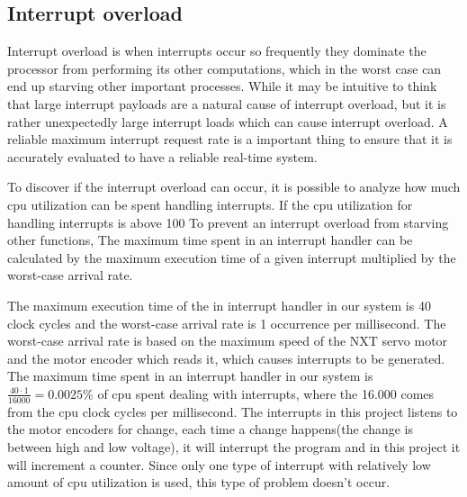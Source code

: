 \subsection{Interrupt overload}
\label{sec:Interrupt overload}


Interrupt overload is when interrupts occur so frequently they dominate the processor from performing its other computations, which in the worst case can end up starving other important processes\citep{safe}. While it may be intuitive to think that large interrupt payloads are a natural cause of interrupt overload, but it is rather unexpectedly large interrupt loads which can cause interrupt overload. A reliable maximum interrupt request rate is a important thing to ensure that it is accurately evaluated to have a reliable real-time system.


To discover if the interrupt overload can occur, it is possible to analyze how much cpu utilization can be spent handling interrupts. If the cpu utilization for handling interrupts is above 100%
To prevent an interrupt overload from starving other functions,
The maximum time spent in an interrupt handler can be calculated by the maximum execution time of a given interrupt multiplied by the worst-case arrival rate. 

The maximum execution time of the in interrupt handler in our system is 40 clock cycles and the worst-case arrival rate is 1 occurrence per millisecond. The worst-case arrival rate is based on the maximum speed of the NXT servo motor and the motor encoder which reads it, which causes interrupts to be generated. \newline
The maximum time spent in an interrupt handler in our system is \begin{math} \frac{40 \cdot 1}{16000} = 0.0025\% \end{math} of cpu spent dealing with interrupts, where the 16.000 comes from the cpu clock cycles per millisecond. The interrupts in this project listens to the motor encoders for change, each time a change happens(the change is between high and low voltage), it will interrupt the program and in this project it will increment a counter. Since only one type of interrupt with relatively low amount of cpu utilization is used, this type of problem doesn’t occur. 


